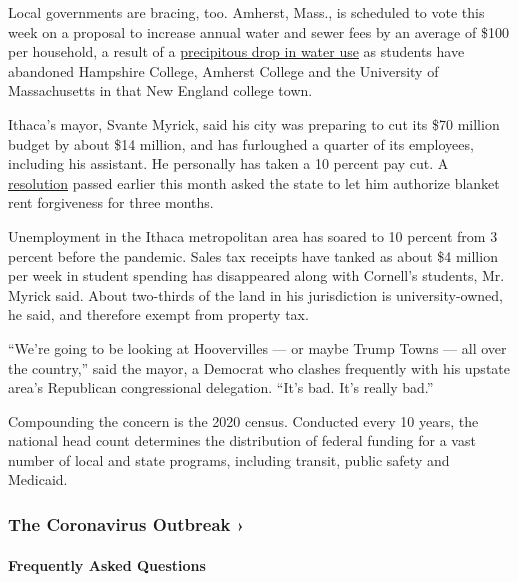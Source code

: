 Local governments are bracing, too. Amherst, Mass., is scheduled to vote
this week on a proposal to increase annual water and sewer fees by an
average of \$100 per household, a result of a
\href{https://www.amherstma.gov/DocumentCenter/View/51625/8b-FY21-Water-and-Sewer-Rate-Memo---61220-FINAL}{precipitous
drop in water use} as students have abandoned Hampshire College, Amherst
College and the University of Massachusetts in that New England college
town.

Ithaca's mayor, Svante Myrick, said his city was preparing to cut its
\$70 million budget by about \$14 million, and has furloughed a quarter
of its employees, including his assistant. He personally has taken a 10
percent pay cut. A
\href{https://www.ithacatu.org/cancelrent}{resolution} passed earlier
this month asked the state to let him authorize blanket rent forgiveness
for three months.

Unemployment in the Ithaca metropolitan area has soared to 10 percent
from 3 percent before the pandemic. Sales tax receipts have tanked as
about \$4 million per week in student spending has disappeared along
with Cornell's students, Mr. Myrick said. About two-thirds of the land
in his jurisdiction is university-owned, he said, and therefore exempt
from property tax.

``We're going to be looking at Hoovervilles --- or maybe Trump Towns ---
all over the country,'' said the mayor, a Democrat who clashes
frequently with his upstate area's Republican congressional delegation.
``It's bad. It's really bad.''

Compounding the concern is the 2020 census. Conducted every 10 years,
the national head count determines the distribution of federal funding
for a vast number of local and state programs, including transit, public
safety and Medicaid.

\href{https://www.nytimes.com/news-event/coronavirus?action=click\&pgtype=Article\&state=default\&region=MAIN_CONTENT_3\&context=storylines_faq}{}

\hypertarget{the-coronavirus-outbreak-}{%
\subsubsection{The Coronavirus Outbreak
›}\label{the-coronavirus-outbreak-}}

\hypertarget{frequently-asked-questions}{%
\paragraph{Frequently Asked
Questions}\label{frequently-asked-questions}}

